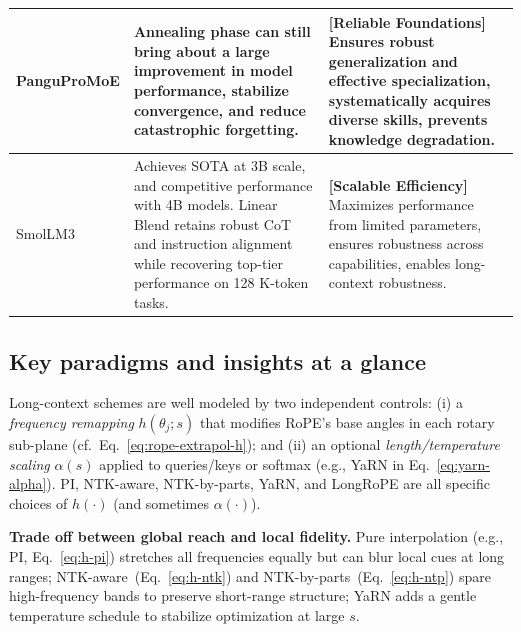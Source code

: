 \begin{table}[h]
\begin{tabular}{p{1.5cm}p{7.6cm}p{7.6cm}}
    \midrule
    PanguProMoE   & Annealing phase can still bring about a large improvement in model performance, stabilize convergence, and reduce catastrophic forgetting. & \textbf{[Reliable Foundations]} Ensures robust generalization and effective specialization, systematically acquires diverse skills, prevents knowledge degradation. \\
    \midrule
    SmolLM3       & Achieves SOTA at 3B scale, and competitive performance with 4B models. Linear Blend retains robust CoT and instruction alignment while recovering top-tier performance on 128 K-token tasks. & \textbf{[Scalable Efficiency]} Maximizes performance from limited parameters, ensures robustness across capabilities, enables long-context robustness. \\
    \bottomrule
  \end{tabular}
\end{table}

\subsection{Key paradigms and insights at a glance}
\label{sec:longcontext-takeaways}
 Long-context schemes are well modeled by two independent controls:
(i) a \emph{frequency remapping} \(h(\theta_j;s)\) that modifies RoPE’s base angles in each rotary sub-plane (cf.\ Eq.~\eqref{eq:rope-extrapol-h}); and
(ii) an optional \emph{length/temperature scaling} \(\alpha(s)\) applied to queries/keys or softmax (e.g., YaRN in Eq.~\eqref{eq:yarn-alpha}).
PI, NTK-aware, NTK-by-parts, YaRN, and LongRoPE are all specific choices of \(h(\cdot)\) (and sometimes \(\alpha(\cdot)\)).

\noindent\textbf{Trade off between global reach and local fidelity.} Pure interpolation (e.g., PI, Eq.~\eqref{eq:h-pi}) stretches all frequencies equally but can blur local cues at long ranges; NTK-aware~(Eq.~\eqref{eq:h-ntk}) and NTK-by-parts~(Eq.~\eqref{eq:h-ntp}) spare high-frequency bands to preserve short-range structure; YaRN adds a gentle temperature schedule to stabilize optimization at large \(s\).


